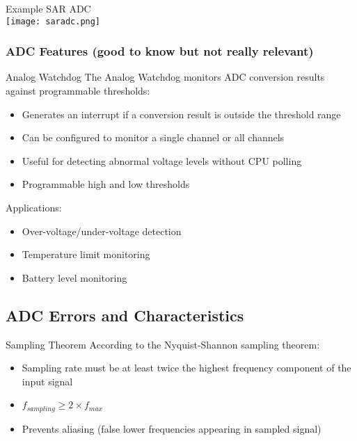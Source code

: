 \begin{theorem}{Example SAR ADC}\\
    \texttt{[image: saradc.png]}
\end{theorem}

\subsubsection{ADC Features (good to know but not really relevant)}
\begin{concept}{Analog Watchdog}
The Analog Watchdog monitors ADC conversion results against programmable thresholds:
\begin{itemize}
    \item Generates an interrupt if a conversion result is outside the threshold range
    \item Can be configured to monitor a single channel or all channels
    \item Useful for detecting abnormal voltage levels without CPU polling
    \item Programmable high and low thresholds
\end{itemize}
Applications:
\begin{itemize}
    \item Over-voltage/under-voltage detection
    \item Temperature limit monitoring
    \item Battery level monitoring
\end{itemize}
\end{concept}


\raggedcolumns
\columnbreak

\subsection{ADC Errors and Characteristics}

\begin{definition}{Sampling Theorem}
According to the Nyquist-Shannon sampling theorem:
\begin{itemize}
    \item Sampling rate must be at least twice the highest frequency component of the input signal
    \item $f_{sampling} \geq 2 \times f_{max}$
    \item Prevents aliasing (false lower frequencies appearing in sampled signal)
\end{itemize}
\end{definition}


